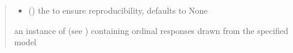 \documentclass[letterpaper,10pt,english]{sphinxmanual}
\begin{document}
\begin{fulllineitems}
\begin{quote}
\begin{description}
\begin{itemize}
\item {} 
\sphinxAtStartPar
{} (\sphinxstyleliteralemphasis{\sphinxupquote{, }}) \textendash{} the  to ensure reproducibility, defaults to None

\end{itemize}

\sphinxAtStartPar
an instance of  (see ) containing ordinal responses drawn from the specified model

\end{description}\end{quote}

\end{fulllineitems}

\end{document}
